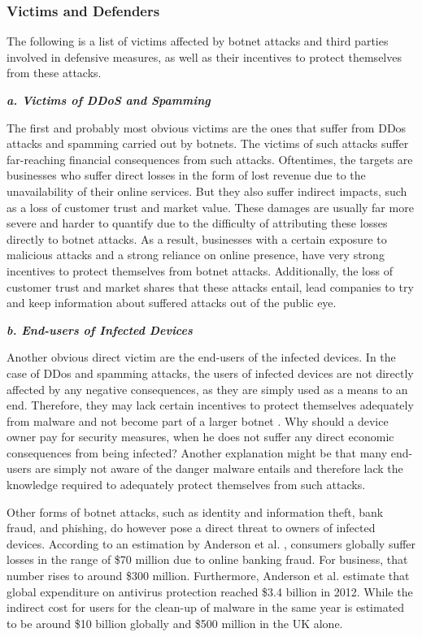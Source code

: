 		\subsubsection{Victims and Defenders}
	The following is a list of victims affected by botnet attacks and third parties involved in defensive measures, as well as their incentives to protect themselves from these attacks.

			\textbf{\textit{a. Victims of DDoS and Spamming}}
			
			The first and probably most obvious victims are the ones that suffer from DDos attacks and spamming carried out by botnets. The victims of such attacks suffer far-reaching financial consequences from such attacks. Oftentimes, the targets are businesses who suffer direct losses in the form of lost revenue due to the unavailability of their online services. But they also suffer indirect impacts, such as a loss of customer trust and market value. These damages are usually far more severe \cite{Anderson13} and harder to quantify due to the difficulty of attributing these losses directly to botnet attacks. As a result, businesses with a certain exposure to malicious attacks and a strong reliance on online presence, have very strong incentives to protect themselves from botnet attacks. Additionally, the loss of customer trust and market shares that these attacks entail, lead companies to try and keep information about suffered attacks out of the public eye.

			\textbf{\textit{b. End-users of Infected Devices}}
			
			Another obvious direct victim are the end-users of the infected devices. In the case of DDos and spamming attacks, the users of infected devices are not directly affected by any negative consequences, as they are simply used as a means to an end. Therefore, they may lack certain incentives to protect themselves adequately from malware and not become part of a larger botnet \cite{Asghari15}. Why should a device owner pay for security measures, when he does not suffer any direct economic consequences from being infected? Another explanation might be that many end-users are simply not aware of the danger malware entails and therefore lack the knowledge required to adequately protect themselves from such attacks.

Other forms of botnet attacks, such as identity and information theft, bank fraud, and phishing, do however pose a direct threat to owners of infected devices. According to an estimation by Anderson et al. \cite{Anderson13}, consumers globally suffer losses in the range of \$70 million due to online banking fraud. For business, that number rises to around \$300 million. Furthermore, Anderson et al. \cite{Anderson13} estimate that global expenditure on antivirus protection reached \$3.4 billion in 2012. While the indirect cost for users for the clean-up of malware in the same year is estimated to be around \$10 billion globally and \$500 million in the UK alone.

